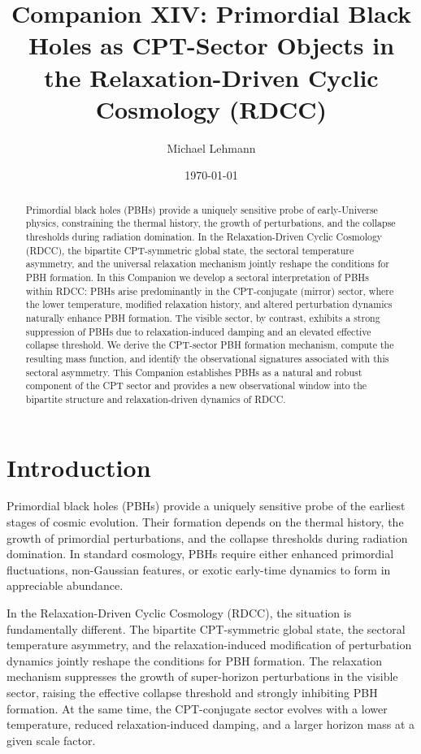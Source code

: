\documentclass[11pt,a4paper]{article}
\title{\textbf{Companion XIV: Primordial Black Holes as CPT-Sector Objects in the Relaxation-Driven Cyclic Cosmology (RDCC)}}
\author[1]{Michael Lehmann}
\affil[1]{\small Independent Researcher, Relaxation-Driven Cyclic Cosmology (RDCC) Framework\\
\texttt{mi.lehmann@gmx.de}}
\date{\small \today}
\begin{document}
\maketitle

\begin{abstract}
Primordial black holes (PBHs) provide a uniquely sensitive probe of early-Universe physics, constraining the thermal history, the growth of perturbations, and the collapse thresholds during radiation domination. In the Relaxation-Driven Cyclic Cosmology (RDCC), the bipartite CPT-symmetric global state, the sectoral temperature asymmetry, and the universal relaxation mechanism jointly reshape the conditions for PBH formation. In this Companion we develop a sectoral interpretation of PBHs within RDCC: PBHs arise predominantly in the CPT-conjugate (mirror) sector, where the lower temperature, modified relaxation history, and altered perturbation dynamics naturally enhance PBH formation. The visible sector, by contrast, exhibits a strong suppression of PBHs due to relaxation-induced damping and an elevated effective collapse threshold. We derive the CPT-sector PBH formation mechanism, compute the resulting mass function, and identify the observational signatures associated with this sectoral asymmetry. This Companion establishes PBHs as a natural and robust component of the CPT sector and provides a new observational window into the bipartite structure and relaxation-driven dynamics of RDCC.
\end{abstract}


\section{Introduction}

Primordial black holes (PBHs) provide a uniquely sensitive probe of the earliest stages of cosmic
evolution. Their formation depends on the thermal history, the growth of primordial
perturbations, and the collapse thresholds during radiation domination. In standard cosmology,
PBHs require either enhanced primordial fluctuations, non-Gaussian features, or exotic early-time
dynamics to form in appreciable abundance.

In the Relaxation-Driven Cyclic Cosmology (RDCC), the situation is fundamentally different.
The bipartite CPT-symmetric global state, the sectoral temperature asymmetry, and the
relaxation-induced modification of perturbation dynamics jointly reshape the conditions for PBH
formation. The relaxation mechanism suppresses the growth of super-horizon perturbations in
the visible sector, raising the effective collapse threshold and strongly inhibiting PBH formation.
At the same time, the CPT-conjugate sector evolves with a lower temperature, reduced
relaxation-induced damping, and a larger horizon mass at a given scale factor.
\end{document}
